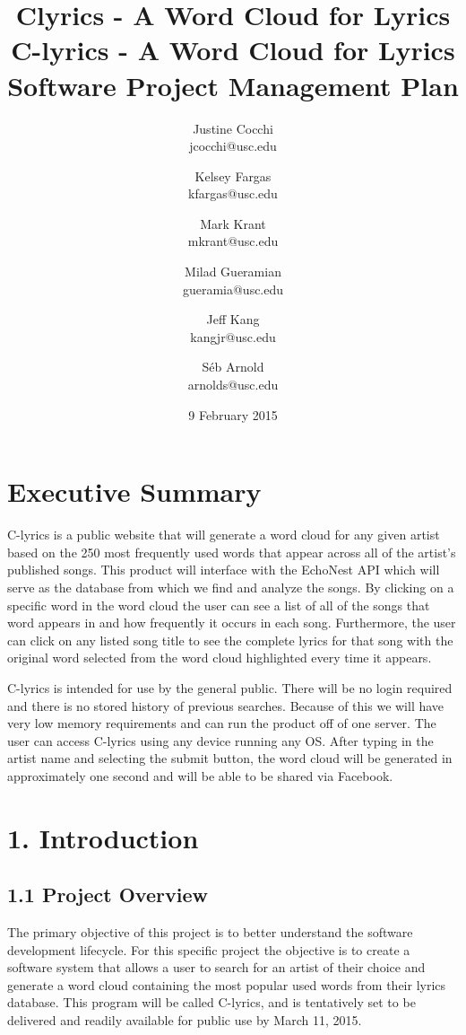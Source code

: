 \documentclass[]{article}
\title{Clyrics - A Word Cloud for Lyrics}
\author{Justine Cocchi\\jcocchi@usc.edu \and Kelsey Fargas\\kfargas@usc.edu \and Mark Krant \\ mkrant@usc.edu\and Milad Gueramian\\gueramia@usc.edu \and Jeff Kang\\kangjr@usc.edu \and Séb Arnold\\arnolds@usc.edu}
\date{9 February 2015}
\title{%
	C-lyrics - A Word Cloud for Lyrics \\
	\large Software Project Management Plan}
\begin{document}
\maketitle

\pagebreak

\tableofcontents
\setcounter{tocdepth}{3}

\pagebreak

\section{Executive Summary}\label{executive-summary}

C-lyrics is a public website that will generate a word cloud for any given artist based on the 250 most frequently used words that appear across all of the artist’s published songs. This product will interface with the EchoNest API which will serve as the database from which we find and analyze the songs. By clicking on a specific word in the word cloud the user can see a list of all of the songs that word appears in and how frequently it occurs in each song. Furthermore, the user can click on any listed song title to see the complete lyrics for that song with the original word selected from the word cloud highlighted every time it appears.

C-lyrics is intended for use by the general public. There will be no login required and there is no stored history of previous searches. Because of this we will have very low memory requirements and can run the product off of one server. The user can access C-lyrics using any device running any OS. After typing in the artist name and selecting the submit button, the word cloud will be generated in approximately one second and will be able to be shared via Facebook.

\pagebreak

\section{1. Introduction}\label{introduction}

\subsection{1.1 Project Overview}\label{project-overview}

The primary objective of this project is to better understand the
software development lifecycle. For this specific project the objective
is to create a software system that allows a user to search for an
artist of their choice and generate a word cloud containing the most
popular used words from their lyrics database. This program will be
called C-lyrics, and is tentatively set to be delivered and readily
available for public use by March 11, 2015.
\end{document}
